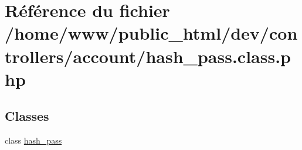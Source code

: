 \hypertarget{hash__pass_8class_8php}{\section{Référence du fichier /home/www/public\-\_\-html/dev/controllers/account/hash\-\_\-pass.class.\-php}
\label{hash__pass_8class_8php}
}
\subsection*{Classes}
\begin{DoxyCompactItemize}
\item 
class \hyperlink{classhash__pass}{hash\-\_\-pass}
\end{DoxyCompactItemize}
